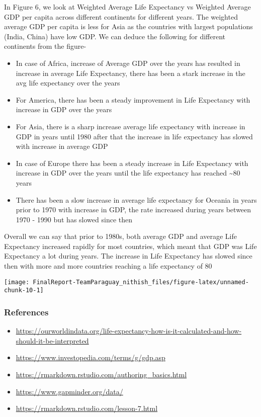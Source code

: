 \documentclass[]{article}
\providecommand{\tightlist}{%
  \setlength{\itemsep}{0pt}\setlength{\parskip}{0pt}}
\begin{document}
In Figure 6, we look at Weighted Average Life Expectancy vs Weighted
Average GDP per capita across different continents for different years.
The weighted average GDP per capita is less for Asia as the countries
with largest populations (India, China) have low GDP. We can deduce the
following for different continents from the figure-

\begin{itemize}
\item
  In case of Africa, increase of Average GDP over the years has resulted
  in increase in average Life Expectancy, there has been a stark
  increase in the avg life expectancy over the years 
\item
  For America, there has been a steady improvement in Life Expectancy
  with increase in GDP over the years 
\item
  For Asia, there is a sharp increase average life expectancy with
  increase in GDP in years until 1980 after that the increase in life
  expectancy has slowed with increase in average GDP 
\item
  In case of Europe there has been a steady increase in Life Expectancy
  with increase in GDP over the years until the life expectancy has
  reached \textasciitilde{}80 years 
\item
  There has been a slow increase in average life expectancy for Oceania
  in years prior to 1970 with increase in GDP, the rate increased during
  years between 1970 - 1990 but has slowed since then 
\end{itemize}

Overall we can say that prior to 1980s, both average GDP and average
Life Expectancy increased rapidly for most countries, which meant that
GDP was Life Expectancy a lot during years. The increase in Life
Expectancy has slowed since then with more and more countries reaching a
life expectancy of 80

\begin{center}\texttt{[image: FinalReport-TeamParaguay\_nithish\_files/figure-latex/unnamed-chunk-10-1]} \end{center}

\hypertarget{references}{%
\subsubsection{References}\label{references}}

\begin{itemize}
\tightlist
\item
  \url{https://ourworldindata.org/life-expectancy-how-is-it-calculated-and-how-should-it-be-interpreted}
\item
  \url{https://www.investopedia.com/terms/g/gdp.asp}
\item
  \url{https://rmarkdown.rstudio.com/authoring_basics.html}
\item
  \url{https://www.gapminder.org/data/}
\item
  \url{https://rmarkdown.rstudio.com/lesson-7.html}
\end{itemize}
\end{document}
